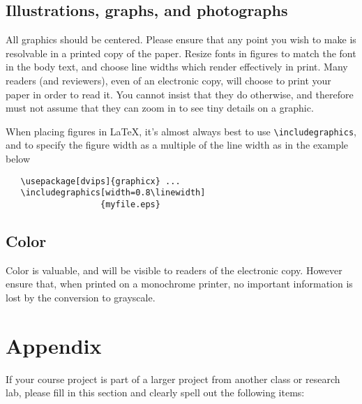 \documentclass[10pt,twocolumn,letterpaper]{article}
\begin{document}
\subsection{Illustrations, graphs, and photographs}

All graphics should be centered.  Please ensure that any point you wish to
make is resolvable in a printed copy of the paper.  Resize fonts in figures
to match the font in the body text, and choose line widths which render
effectively in print.  Many readers (and reviewers), even of an electronic
copy, will choose to print your paper in order to read it.  You cannot
insist that they do otherwise, and therefore must not assume that they can
zoom in to see tiny details on a graphic.

When placing figures in \LaTeX, it's almost always best to use
\verb+\includegraphics+, and to specify the  figure width as a multiple of
the line width as in the example below
{\small\begin{verbatim}
   \usepackage[dvips]{graphicx} ...
   \includegraphics[width=0.8\linewidth]
                   {myfile.eps}
\end{verbatim}
}


\subsection{Color}

Color is valuable, and will be visible to readers of the electronic copy.
However ensure that, when printed on a monochrome printer, no important
information is lost by the conversion to grayscale.

{\small


}

\section{Appendix}
If your course project is part of a larger project from another class or research lab, please fill in this section and clearly spell out the following items:
\end{document}
